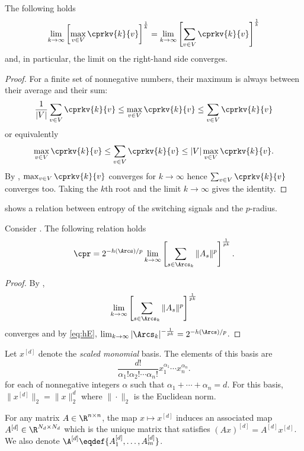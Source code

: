 \documentclass[11pt,twoside,a4paper,openright]{uclouvain-thesis}
\newcommand{\expfrac}[2]{#1/#2}
\begin{document}
\begin{mycoro}
  \label{coro:summax}
  The following holds
  \[ \lim_{k \to \infty} \left[\max_{v \in V} \cprkv{k}{v}\right]^{\frac{1}{k}} = \lim_{k \to \infty} \left[\sum_{v \in V} \cprkv{k}{v}\right]^{\frac{1}{k}} \]
  and, in particular, the limit on the right-hand side converges.

  \begin{proof}
    For a finite set of nonnegative numbers, their maximum is always between their average and their sum:
    \[ \frac{1}{|V|} \sum_{v \in V} \cprkv{k}{v} \leq \max_{v \in V} \cprkv{k}{v} \leq \sum_{v \in V} \cprkv{k}{v} \]
    or equivalently
    \[ \max_{v \in V} \cprkv{k}{v} \leq \sum_{v \in V} \cprkv{k}{v} \leq |V| \max_{v \in V} \cprkv{k}{v}. \]
    By , $\max_{v \in V} \cprkv{k}{v}$ converges for $k \to \infty$ hence $\sum_{v \in V} \cprkv{k}{v}$ converges too.
    Taking the $k$th root and the limit $k \to \infty$ gives the identity.
  \end{proof}
\end{mycoro}

 shows a relation between entropy of the switching signals and the $p$-radius.

\begin{mytheo}
  \label{theo:pradiusentropy}
  Consider .
  The following relation holds
  \[
    \cpr = 2^{-\expfrac{h(\Arcs)}{p}}
    \lim_{k \to \infty}
    \left[
      \sum_{s \in \Arcs_k} \|A_s\|^p
    \right]^{\frac{1}{pk}}.
  \]
  \begin{proof}
    By ,
    \[
      \lim_{k \to \infty}
      \left[
        \sum_{s \in \Arcs_k} \|A_s\|^p
      \right]^{\frac{1}{pk}}
    \]
    converges and
    by \eqref{eq:hE}, $\lim_{k \to \infty} |\Arcs_k|^{-\frac{1}{pk}} = 2^{-h(\Arcs)/p}$.
  \end{proof}
\end{mytheo}


Let $x^{[d]}$ denote the \emph{scaled monomial} basis.
The elements of this basis are
\[ \frac{d!}{\alpha_1!\alpha_2!\cdots\alpha_n!} x_1^{\alpha_1} \cdots x_n^{\alpha_n}. \]
for each  of nonnegative integers $\alpha$ such that
$\alpha_1 + \cdots + \alpha_n = d$.
For this basis, $\|x^{[d]}\|_2 = \|x\|_2^d$ where $\|\cdot\|_2$ is the Euclidean norm.


For any matrix $A \in \R^{n \times n}$, the map $x \mapsto x^{[d]}$ induces an
associated map $A^{[d]} \in \R^{N_d \times N_d}$ which is the unique
matrix that satisfies $(Ax)^{[d]} = A^{[d]}x^{[d]}$.
We also denote $\A^{[d]} \eqdef \{A_1^{[d]}, \ldots, A_m^{[d]}\}$.
\end{document}
